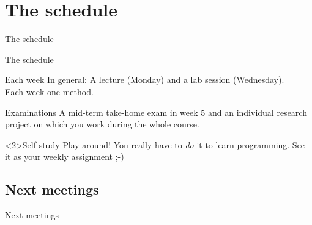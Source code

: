 \documentclass{beamer}
\begin{document}
\section{The schedule}
\begin{frame}
The schedule
\end{frame}

\begin{frame}{The schedule}
\begin{block}{Each week}
In general: A lecture (Monday) and a lab session (Wednesday). \\ Each week one method.
\end{block}
\begin{block}{Examinations}
A mid-term take-home exam in week 5 and an individual research project on which you work during the whole course.
\end{block}


\begin{alertblock}<2>{Self-study}
Play around! You really have to \emph{do} it to learn programming. See it as your weekly assignment ;-)
\end{alertblock}
\end{frame}


\subsection{Next meetings}
\begin{frame}
Next meetings
\end{frame}
\end{document}
